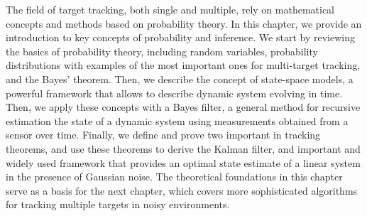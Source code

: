 The field of target tracking, both single and multiple, rely on mathematical concepts and methods based on probability theory. In this chapter, we provide an introduction to key concepts of probability and inference. We start by reviewing the basics of probability theory, including random variables, probability distributions with examples of the most important ones for multi-target tracking, and the Bayes' theorem. Then, we describe the concept of state-space models, a powerful framework that allows to describe dynamic system evolving in time. Then, we apply these concepts with a Bayes filter, a general method for recursive estimation the state of a dynamic system using measurements obtained from a sensor over time. Finally, we define and prove two important in tracking theorems, and use these theorems to derive the Kalman filter, and important and widely used framework that provides an optimal state estimate of a linear system in the presence of Gaussian noise. The theoretical foundations in this chapter serve as a basis for the next chapter, which covers more sophisticated algorithms for tracking multiple targets in noisy environments.
